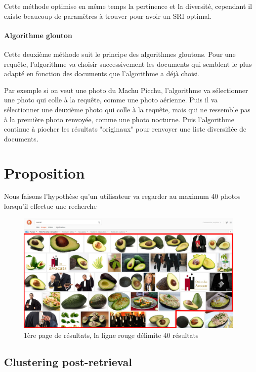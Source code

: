 \documentclass{article}
\begin{document}
Cette méthode optimise en même temps la pertinence et la diversité, cependant il existe beaucoup de paramètres à trouver pour avoir un SRI optimal.



\paragraph{Algorithme glouton}
Cette deuxième méthode suit le principe des algorithmes gloutons. Pour une requête, l'algorithme va choisir successivement les documents qui semblent le plus adapté en fonction des documents que l'algorithme a déjà choisi.

Par exemple si on veut une photo du Machu Picchu, l'algorithme va sélectionner une photo qui colle à la requête, comme une photo aérienne. Puis il va sélectionner une deuxième photo qui colle à la requête, mais qui ne ressemble pas à la première photo renvoyée, comme une photo nocturne. Puis l'algorithme continue à piocher les résultats "originaux" pour renvoyer une liste diversifiée de documents.

\section{Proposition}

Nous faisons l'hypothèse qu'un utilisateur va regarder au maximum 40 photos lorsqu'il effectue une recherche 

\begin{figure}[H]
\caption{1ère page de résultats, la ligne rouge délimite 40 résultats}
\centering
\includegraphics[width=13cm]{40_images.png}
\end{figure}

\subsection{Clustering post-retrieval}
\end{document}
